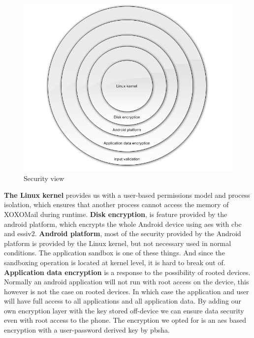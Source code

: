 \begin{figure}[H]
	\includegraphics[width=\textwidth]{securityview.png}
	\caption{Security view}
	\label{fig:securityview}
\end{figure} \hfill
\newline
\newline
\textbf{The Linux kernel} provides us with a user-based permissions model and process isolation, which ensures that another process cannot access the memory of XOXOMail during runtime.
\newline
\newline
\textbf{Disk encryption}, is feature provided by the android platform, which encrypts the whole Android device using \gls{aes} with \gls{cbc} and \gls{essiv2}.\cite{bib:crypto}
\newline
\newline
\textbf{Android platform}, most of the security provided by the Android platform is provided by the Linux kernel, but not necessary used in normal conditions. The application sandbox is one of these things. And since the sandboxing operation is located at kernel level, it is hard to break out of. 
\newline
\newline
\textbf{Application data encryption} is a response to the possibility of rooted devices. Normally an android application will not run with root access on the device, this however is not the case on rooted devices. In which case the application and user will have full access to all applications and all application data. By adding our own encryption layer with the key stored off-device we can ensure data security even with root access to the phone\cite{bib:tech}. The encryption we opted for is an \gls{aes} based encryption with a user-password derived key by \gls{pbsha}.
